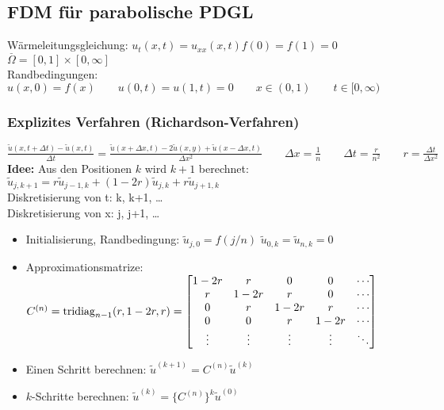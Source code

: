 \subsection{FDM für parabolische PDGL}
Wärmeleitungsgleichung: $\boxed{u_t(x,t)=u_{xx}(x,t)}$\qquad $f(0)=f(1)=0$ \qquad$ \overset{\_}{\Omega}=[0,1]\times [0,\infty]$\\

Randbedingungen: $u(x,0)=f(x) \qquad u(0,t)=u(1,t)=0\qquad x\in(0,1) \qquad t\in[0,\infty)$


\subsubsection{Explizites Verfahren (Richardson-Verfahren)}
$\boxed{\frac{\tilde{u}(x,t+\Delta t) - \tilde{u}(x,t)}{\Delta t} =
    \frac{\tilde{u}(x+\Delta x, t)-2\tilde{u}(x,y) + \tilde{u}( x - \Delta x, t )} {\Delta x^2}} \qquad \Delta x=\frac{1}{n} \qquad \Delta t=\frac{r}{n^2} \qquad \boxed{r=\frac{\Delta
      t}{\Delta x^2}}$\\

\textbf{Idee:} Aus den Positionen $k$ wird $k+1$ berechnet: $\tilde{u}_{j,k+1} = r \tilde{u}_{j-1,k} + (1-2r)\tilde{u}_{j,k} + r \tilde{u}_{j+1,k}$\\
Diskretisierung von t: k, k+1, \ldots\\
Diskretisierung von x: j, j+1, \ldots\\

\begin{itemize}
  \item Initialisierung, Randbedingung: $\tilde{u}_{j,0}=f(j/n)$ \qquad $\tilde{u}_{0,k}=\tilde{u}_{n,k}=0$
  \item Approximationsmatrize: $C^{(n)}=\operatorname{tridiag}_{n-1}(r,1-2r,r)=\begin{bmatrix}
            1-2r   & r      & 0      & 0      & \cdots \\
            r      & 1-2r   & r      & 0      & \cdots \\
            0      & r      & 1-2r   & r      & \cdots \\
            0      & 0      & r      & 1-2r   & \cdots \\
            \vdots & \vdots & \vdots & \vdots & \ddots
          \end{bmatrix}$
  \item Einen Schritt berechnen: $\tilde{u}^{(k+1)}=C^{(n)} \tilde{u}^{(k)}$
  \item $k$-Schritte berechnen: $\tilde{u}^{(k)}=\big\{C^{(n)}\big\}^k \tilde{u}^{(0)}$
\end{itemize}


